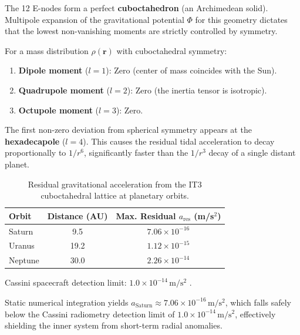 \documentclass[11pt,a4paper]{article}
\theoremstyle{remark}
\begin{document}
The 12 E-nodes form a perfect \textbf{cuboctahedron} (an Archimedean solid). Multipole expansion of the gravitational potential $\Phi$ for this geometry dictates that the lowest non-vanishing moments are strictly controlled by symmetry.

For a mass distribution $\rho(\mathbf{r})$ with cuboctahedral symmetry:
\begin{enumerate}[label=(\roman*), leftmargin=2em]
    \item \textbf{Dipole moment} ($l=1$): Zero (center of mass coincides with the Sun).
    \item \textbf{Quadrupole moment} ($l=2$): Zero (the inertia tensor is isotropic).
    \item \textbf{Octupole moment} ($l=3$): Zero.
\end{enumerate}

The first non-zero deviation from spherical symmetry appears at the \textbf{hexadecapole} ($l=4$). This causes the residual tidal acceleration to decay proportionally to $1/r^6$, significantly faster than the $1/r^3$ decay of a single distant planet.

\begin{table}[htbp]
    \centering
    \caption{Residual gravitational acceleration from the IT3 cuboctahedral lattice at planetary orbits.}
    \label{tab:acceleration}
    \begin{threeparttable}
    \begin{tabular}{lcc}
        \toprule
        \textbf{Orbit} & \textbf{Distance (AU)} & \textbf{Max. Residual $a_{\text{res}}$ (m/s$^2$)} \\
        \midrule
        Saturn  & 9.5  & $7.06 \times 10^{-16}$ \\
        Uranus  & 19.2 & $1.12 \times 10^{-15}$ \\
        Neptune & 30.0 & $2.26 \times 10^{-14}$ \\
        \bottomrule
    \end{tabular}
    \begin{tablenotes}
        \small
        \item Cassini spacecraft detection limit: $1.0 \times 10^{-14}\,\mathrm{m/s^2}$ \cite{fienga2016}.
    \end{tablenotes}
    \end{threeparttable}
\end{table}

Static numerical integration yields $a_{\text{Saturn}} \approx 7.06 \times 10^{-16}\,\mathrm{m/s^2}$, which falls safely below the Cassini radiometry detection limit of $1.0 \times 10^{-14}\,\mathrm{m/s^2}$, effectively shielding the inner system from short-term radial anomalies. 
\end{document}
